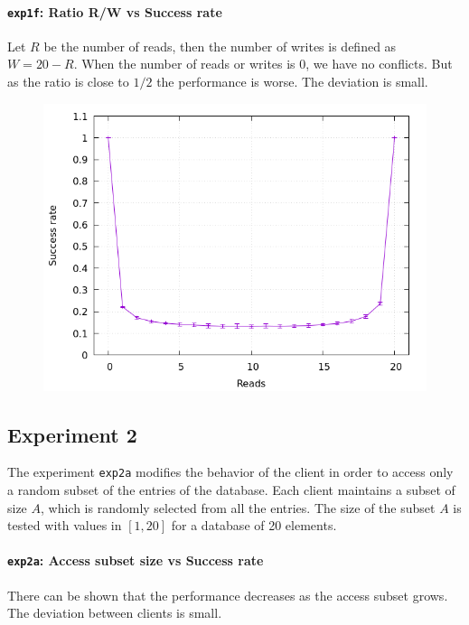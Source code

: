 \documentclass[a4paper, 11pt]{article}
\begin{document}
\newpage
\paragraph{\texttt{exp1f}: Ratio R/W vs Success rate}

Let $R$ be the number of reads, then the number of writes is defined as $W = 20 
- R$.  When the number of reads or writes is 0, we have no conflicts.  But as 
the ratio is close to $1/2$ the performance is worse.  The deviation is small.
\nopagebreak
\begin{figure}[H]
\centering
\includegraphics[width=.8\linewidth]{exp1/f/fig.png}
\end{figure}

\subsection{Experiment 2}

The experiment \texttt{exp2a} modifies the behavior of the client in order to 
access only a random subset of the entries of the database. Each client 
maintains a subset of size $A$, which is randomly selected from all the entries.
The size of the subset $A$ is tested with values in $[1, 20]$ for a database of 
20 elements.

\newpage
\paragraph{\texttt{exp2a}: Access subset size vs Success rate}

There can be shown that the performance decreases as the access subset grows.  
The deviation between clients is small.
\end{document}
